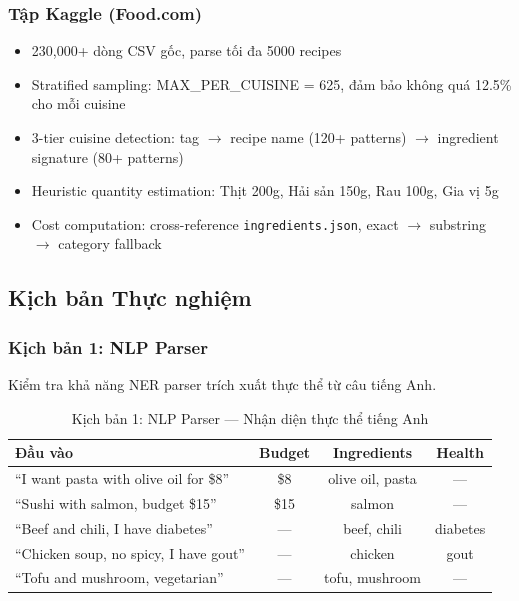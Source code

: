 \subsubsection{Tập Kaggle (Food.com)}
\begin{itemize}
    \item 230,000+ dòng CSV gốc, parse tối đa 5000 recipes
    \item Stratified sampling: MAX\_PER\_CUISINE = 625, đảm bảo không quá 12.5\% cho mỗi cuisine
    \item 3-tier cuisine detection: tag $\to$ recipe name (120+ patterns) $\to$ ingredient signature (80+ patterns)
    \item Heuristic quantity estimation: Thịt 200g, Hải sản 150g, Rau 100g, Gia vị 5g
    \item Cost computation: cross-reference \texttt{ingredients.json}, exact $\to$ substring $\to$ category fallback
\end{itemize}

\subsection{Kịch bản Thực nghiệm}

\subsubsection{Kịch bản 1: NLP Parser}
Kiểm tra khả năng NER parser trích xuất thực thể từ câu tiếng Anh.

\begin{table}[H]
\centering
\small
\begin{tabular}{|p{7cm}|c|c|c|}
\hline
\textbf{Đầu vào} & \textbf{Budget} & \textbf{Ingredients} & \textbf{Health} \\
\hline
``I want pasta with olive oil for \$8'' & \$8 & olive oil, pasta & --- \\
\hline
``Sushi with salmon, budget \$15'' & \$15 & salmon & --- \\
\hline
``Beef and chili, I have diabetes'' & --- & beef, chili & diabetes \\
\hline
``Chicken soup, no spicy, I have gout'' & --- & chicken & gout \\
\hline
``Tofu and mushroom, vegetarian'' & --- & tofu, mushroom & --- \\
\hline
\end{tabular}
\caption{Kịch bản 1: NLP Parser --- Nhận diện thực thể tiếng Anh}
\label{tab:exp_nlp}
\end{table}


